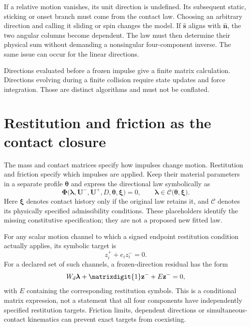 \documentclass[11pt,a4paper]{article}
\newcommand{\id}{\matrixdigit{1}}
\begin{document}
If a relative motion vanishes, its unit direction is undefined. Its subsequent static, sticking or onset branch must come from the contact law. Choosing an arbitrary direction and calling it sliding or spin changes the model. If $\hat{\mathbf{s}}$ aligns with $\hat{\mathbf{n}}$, the two angular columns become dependent. The law must then determine their physical sum without demanding a nonsingular four-component inverse. The same issue can occur for the linear directions.

Directions evaluated before a frozen impulse give a finite matrix calculation. Directions evolving during a finite collision require state updates and force integration. Those are distinct algorithms and must not be conflated.

\section{Restitution and friction as the contact closure}
The mass and contact matrices specify how impulses change motion. Restitution and friction specify which impulses are applied. Keep their material parameters in a separate profile $\boldsymbol{\theta}$ and express the directional law symbolically as
\begin{equation}
\boldsymbol{\Phi}\bigl(\boldsymbol{\lambda},\mathbf{U}^-,\mathbf{U}^+,D,
\boldsymbol{\theta},\boldsymbol{\xi}\bigr)=0,\qquad
\boldsymbol{\lambda}\in\mathcal C\bigl(\boldsymbol{\theta},\boldsymbol{\xi}\bigr).
\end{equation}
Here $\boldsymbol{\xi}$ denotes contact history only if the original law retains it, and $\mathcal C$ denotes its physically specified admissibility conditions. These placeholders identify the missing constitutive specification; they are not a proposed new fitted law.

For any scalar motion channel to which a signed endpoint restitution condition actually applies, its symbolic target is
\begin{equation}
z_i^++e_i z_i^-=0.
\end{equation}
For a declared set of such channels, a frozen-direction residual has the form
\begin{equation}
W_d\boldsymbol{\lambda}+\id \mathbf{z}^-+E\mathbf{z}^-=0,
\end{equation}
with $E$ containing the corresponding restitution symbols. This is a conditional matrix expression, not a statement that all four components have independently specified restitution targets. Friction limits, dependent directions or simultaneous-contact kinematics can prevent exact targets from coexisting.
\end{document}
